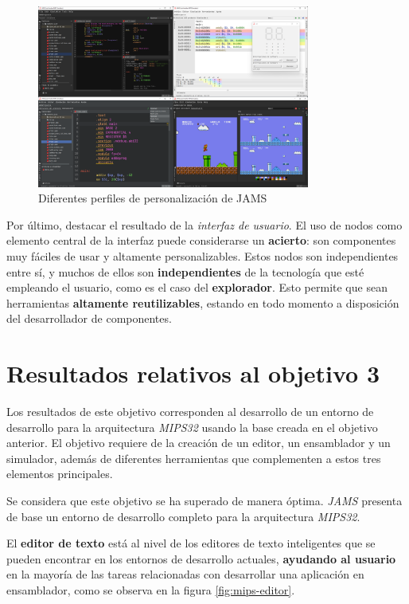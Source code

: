 \begin{figure}[h]
    \centering
    \includegraphics[width=0.8\textwidth]{images/result/jams-collage}
    \caption{Diferentes perfiles de personalización de JAMS}
    \label{fig:jams-collage}
\end{figure}

\noindent Por último, destacar el resultado de la \textit{interfaz de usuario}.
El uso de nodos como elemento central de la interfaz puede considerarse
un \textbf{acierto}: son componentes muy fáciles de usar y altamente personalizables.
Estos nodos son independientes entre sí, y muchos de ellos son \textbf{independientes}
de la tecnología que esté empleando el usuario, como es el caso del \textbf{explorador}.
Esto permite que sean herramientas \textbf{altamente reutilizables}, estando en todo
momento a disposición del desarrollador de componentes.


\section{Resultados relativos al objetivo 3}\label{sec:resultados-relativos-al-objetivo-3}

Los resultados de este objetivo corresponden al desarrollo
de un entorno de desarrollo para la arquitectura \textit{MIPS32}
usando la base creada en el objetivo anterior.
El objetivo requiere de la creación de un editor, un ensamblador
y un simulador, además de diferentes herramientas que complementen
a estos tres elementos principales.

\noindent Se considera que este objetivo se ha superado
de manera óptima.
\textit{JAMS} presenta de base un entorno de desarrollo completo
para la arquitectura \textit{MIPS32}.

\noindent El \textbf{editor de texto} está al nivel de los editores de texto
inteligentes que se pueden encontrar en los entornos de desarrollo
actuales, \textbf{ayudando al usuario} en la mayoría de las tareas
relacionadas con desarrollar una aplicación en ensamblador, como se observa
en la figura \ref{fig:mips-editor}.

